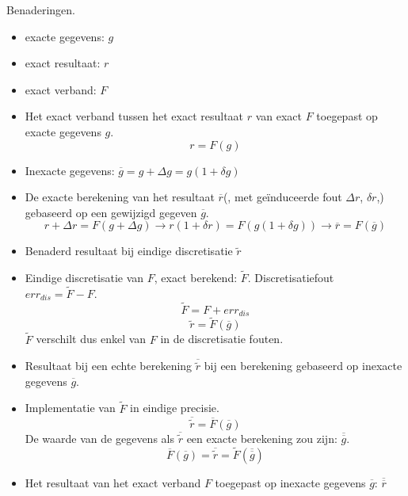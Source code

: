 \documentclass[samenvatting.tex]{subfiles}
\begin{document}
\begin{defi} Benaderingen.\\
\begin{itemize}
\item exacte gegevens: $g$

\item exact resultaat: $r$

\item exact verband: $F$

\item Het exact verband tussen het exact resultaat $r$ van exact $F$ toegepast op exacte gegevens $g$.
\[
r = F(g)
\]

\item Inexacte gegevens: $\overline{g} = g + \Delta g = g(1+\delta g)$

\item De exacte berekening van het resultaat $\overline{r}$(, met ge\"induceerde fout $\Delta r$, $\delta r$,) gebaseerd op een gewijzigd gegeven $\overline{g}$.
\[
r + \Delta r = F(g + \Delta g) \rightarrow r(1+\delta r) = F(g(1+\delta g)) \rightarrow \overline{r} = F(\overline{g})
\]

\item Benaderd resultaat bij eindige discretisatie $\widetilde{r}$

\item Eindige discretisatie van $F$, exact berekend: $\widetilde{F}$. Discretisatiefout $err_{dis} = \widetilde{F} - F$.
\[
\widetilde{F} = F + err_{dis}
\]
\[
\widetilde{r} = \widetilde{F}(\overline{g})
\]
$\widetilde{F}$ verschilt dus enkel van $F$ in de discretisatie fouten.

\item Resultaat bij een echte berekening $\overline{\widetilde{r}}$ bij een berekening gebaseerd op inexacte gegevens $\overline{g}$.

\item 
Implementatie van $\widetilde{F}$ in eindige precisie.
\[
\overline{\widetilde{r}} = \overline{F}(\overline{g})
\]
De waarde van de gegevens als $\overline{\widetilde{r}}$ een exacte berekening zou zijn: $\overline{\overline{g}}$.
\[
\overline{F}(\overline{g}) = \overline{\widetilde{r}} = \widetilde{F}(\overline{\overline{g}})
\]

\item Het resultaat van het exact verband $F$ toegepast op inexacte gegevens $\overline{g}$: $\overline{\overline{r}}$

\end{itemize}
\end{defi}
\end{document}
